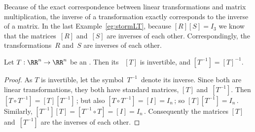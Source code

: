 Because of the exact correspondence between linear transformations and matrix multiplication, the inverse of a transformation exactly corresponds to the inverse of a matrix.
In the last Example~\ref{eg:stormLT}, because \([R][S]=I_3\) we know that the matrices~\([R]\) and~\([S]\) are inverses of each other. 
Correspondingly, the transformations~\(R\) and~\(S\) are inverses of each other.




\begin{theorem} \label{thm:} 
Let \(T:\RR^n\to\RR^n\) be an  . 
Then its ~\([T]\) is invertible, and \([T^{-1}]=[T]^{-1}\). 
\end{theorem}
\begin{proof} 
As \(T\) is invertible,  let the symbol~\(T^{-1}\)~denote its inverse.
Since both are linear transformations, they both have standard matrices, \([T]\) and~\([T^{-1}]\).
Then \([T\circ T^{-1}]=[T][T^{-1}]\)\,; but also \([T\circ T^{-1}]=[I]=I_n\)\,; so \([T][T^{-1}]=I_n\)\,.
Similarly, \([T^{-1}][T]=[T^{-1}\circ T]=[I]=I_n\)\,.
Consequently the matrices \([T]\) and~\([T^{-1}]\) are the inverses of each other.
\end{proof}


